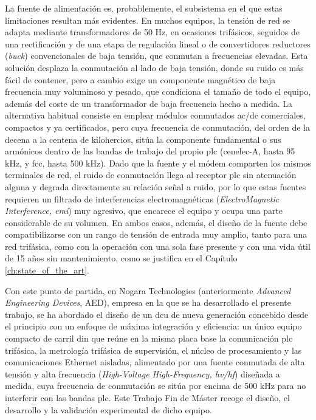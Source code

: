 La fuente de alimentación es, probablemente, el subsistema en el que estas limitaciones resultan más evidentes. En muchos equipos, la tensión de red se adapta mediante transformadores de 50 Hz, en ocasiones trifásicos, seguidos de una rectificación y de una etapa de regulación lineal o de convertidores reductores (\textit{buck}) convencionales de baja tensión, que conmutan a frecuencias elevadas. Esta solución desplaza la conmutación al lado de baja tensión, donde su ruido es más fácil de contener, pero a cambio exige un componente magnético de baja frecuencia muy voluminoso y pesado, que condiciona el tamaño de todo el equipo, además del coste de un transformador de baja frecuencia hecho a medida. La alternativa habitual consiste en emplear módulos conmutados \gls{ac}/\gls{dc} comerciales, compactos y ya certificados, pero cuya frecuencia de conmutación, del orden de la decena a la centena de kilohercios, sitúa la componente fundamental o sus armónicos dentro de las bandas de trabajo del propio \gls{plc} (\gls{cenelec}-A, hasta 95 kHz, y \gls{fcc}, hasta 500 kHz). Dado que la fuente y el módem comparten los mismos terminales de red, el ruido de conmutación llega al receptor \gls{plc} sin atenuación alguna y degrada directamente su relación señal a ruido, por lo que estas fuentes requieren un filtrado de interferencias electromagnéticas (\textit{ElectroMagnetic Interference, \gls{emi}}) muy agresivo, que encarece el equipo y ocupa una parte considerable de su volumen. En ambos casos, además, el diseño de la fuente debe compatibilizarse con un rango de tensión de entrada muy amplio, tanto para una red trifásica, como con la operación con una sola fase presente y con una vida útil de 15 años sin mantenimiento, como se justifica en el Capítulo \ref{ch:state_of_the_art}.

Con este punto de partida, en Nogara Technologies (anteriormente \textit{Advanced Engineering Devices}, AED), empresa en la que se ha desarrollado el presente trabajo, se ha abordado el diseño de un \gls{dcu} de nueva generación concebido desde el principio con un enfoque de máxima integración y eficiencia: un único equipo compacto de carril \gls{din} que reúne en la misma placa base la comunicación \gls{plc} trifásica, la metrología trifásica de supervisión, el núcleo de procesamiento y las comunicaciones Ethernet aisladas, alimentado por una fuente conmutada de alta tensión y alta frecuencia (\textit{High-Voltage High-Frequency, \gls{hv}/\gls{hf}}) diseñada a medida, cuya frecuencia de conmutación se sitúa por encima de 500 kHz para no interferir con las bandas \gls{plc}. Este Trabajo Fin de Máster recoge el diseño, el desarrollo y la validación experimental de dicho equipo.

